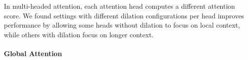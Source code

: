 In multi-headed attention, each attention head computes a different attention score.  We found settings with different dilation configurations per head improves performance by allowing some heads without dilation to focus on local context, while others with dilation focus on longer context.


\paragraph{Global Attention} 

